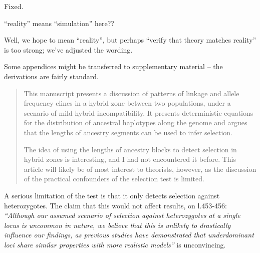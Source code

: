 \reply
Fixed.

\begin{point}{\revref}
``reality'' means ``simulation'' here??
\end{point}

\reply
Well, we hope to mean ``reality'', but perhaps ``verify that theory matches reality'' is too strong; we've adjusted the wording.

\begin{point}{}
 Some appendices might be transferred to supplementary material -- the derivations are fairly standard.
\end{point}

\reply
{}




\begin{quote}
    This manuscript presents a discussion of patterns of linkage and allele frequency clines in a hybrid zone between two populations, under a scenario of mild hybrid incompatibility. It presents deterministic equations for the distribution of ancestral haplotypes along the genome and argues that the lengths of ancestry segments can be used to infer selection.

    The idea of using the lengths of ancestry blocks to detect selection in hybrid zones is interesting, and I had not encountered it before. This article will likely be of most interest to theorists, however, as the discussion of the practical confounders of the selection test is limited. 
\end{quote}

\begin{point}{}
    A serious limitation of the test is that it only detects selection against heterozygotes. The claim that this would not affect results, on l.453-456:
    \textit{``Although our assumed scenario of selection against heterozygotes at a single locus is uncommon in nature, we believe that this is unlikely to drastically influence our findings, as previous studies have demonstrated that underdominant loci share similar properties with more realistic models''}
    is unconvincing.
\end{point}

